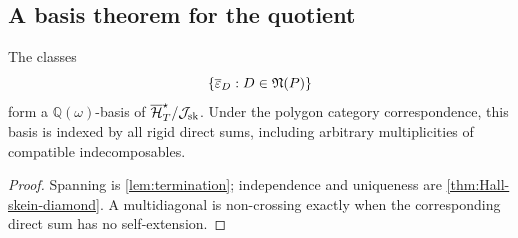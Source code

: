 \subsection{A basis theorem for the quotient}

\begin{corollary}
\label{cor:rigid-normal-basis}
The classes
\begin{equation}
 \left\{\overline{\varepsilon}_D:D\in\mathfrak N(P)\right\}
 \label{eq:quotient-rigid-basis}
\end{equation}
form a $\mathbb Q(\omega)$-basis of $\overline{\mathcal H}_{T}^{\star}/\mathcal J_{\mathrm{sk}}$.  Under the polygon
category correspondence, this basis is indexed by all rigid direct sums,
including arbitrary multiplicities of compatible indecomposables.
\end{corollary}

\begin{proof}
Spanning is \cref{lem:termination}; independence and uniqueness are
\cref{thm:Hall-skein-diamond}.  A multidiagonal is non-crossing exactly when
the corresponding direct sum has no self-extension.
\end{proof}
